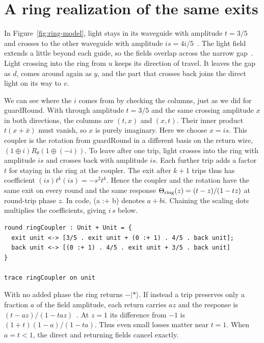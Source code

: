 \documentclass[acmsmall,screen,review,anonymous,nonacm]{acmart}
\newcommand{\storyinlineface}{\small\ttfamily}
\newcommand{\code}[1]{\textnormal{\storyinlineface #1}}
\newcommand{\ket}[1]{\lvert #1\rangle}
\numberwithin{equation}{section}
\begin{document}
\section{A ring realization of the same exits}\label{sec:ring}
In Figure~\ref{fig:ring-model}, light stays in its waveguide with
amplitude $t=3/5$ and crosses to the other waveguide with amplitude
$is=4i/5$~\cite[Eq.~(1)]{HeebnerBoyd99Ring}. The light field extends
a little beyond each guide, so the fields overlap across the narrow
gap~\cite{Alsing17RingLoss}. Light crossing into the ring from $u$ keeps
its direction of travel. It leaves the gap as $d$, comes around again as
$y$, and the part that crosses back joins the direct light on its way
to $v$.

We can see where the $i$ comes from by checking the columns, just as we
did for \code{guardRound}. With through amplitude $t=3/5$ and the same
crossing amplitude $x$ in both directions, the columns are $(t,x)$ and
$(x,t)$. Their inner product $t(x+\bar x)$ must vanish, so $x$ is
purely imaginary. Here we choose $x=is$. This coupler is the rotation from \code{guardRound} in
a different basis on the return wire,
$(1\oplus i)R_\theta(1\oplus(-i))$. To leave after one trip, light crosses into the ring with amplitude
$is$ and crosses back with amplitude $is$. Each further trip adds a
factor $t$ for staying in the ring at the coupler. The exit after
$k+1$ trips thus has coefficient $(is)t^k(is)=-s^2t^k$. Hence the coupler and the rotation have the
same exit on every round and the same response
$\Theta_{\rm ring}(z)=(t-z)/(1-tz)$ at round-trip phase $z$.
In code, \code{(a :+ b)} denotes $a+bi$. Chaining the scaling dots multiplies the coefficients, giving $i\,s$ below.
\par\noindent\begin{minipage}{\linewidth}
\begin{lstlisting}
round ringCoupler : Unit + Unit = {
  exit unit <-> [3/5 . exit unit + (0 :+ 1) . 4/5 . back unit];
  back unit <-> [(0 :+ 1) . 4/5 . exit unit + 3/5 . back unit]
}

trace ringCoupler on unit
\end{lstlisting}
\end{minipage}\par
With no added phase the ring returns $-\ket*$. If instead a trip preserves only a fraction
$a$ of the field amplitude, each return carries $az$ and the response is
$(t-az)/(1-taz)$~\cite[Eq.~(6)]{Alsing17RingLoss}. At $z=1$ its difference from $-1$ is
$(1+t)(1-a)/(1-ta)$. Thus even small losses matter near $t=1$. When $a=t<1$, the direct
and returning fields cancel exactly.
\end{document}
